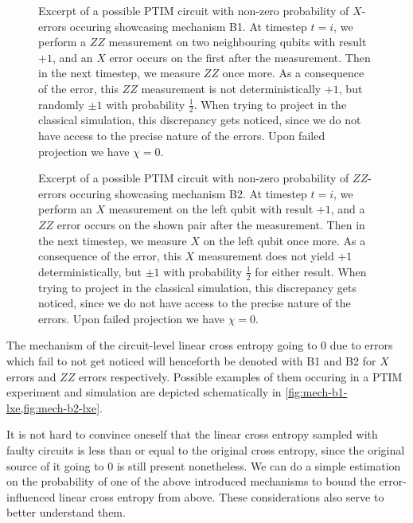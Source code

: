 \begin{figure}[t]
  \centering
  
  \caption{Excerpt of a possible PTIM circuit with non-zero probability of
  $X$-errors occuring showcasing mechanism \textsf{B1}. At timestep $t=i$, 
  we perform a $ZZ$ measurement on two neighbouring qubits with result $+1$,
  and an $X$ error occurs on the first after the measurement. Then in the next
  timestep, we measure $ZZ$ once more. As a consequence of the error, this $ZZ$
  measurement is not deterministically $+1$, but randomly $\pm 1$ with
  probability $\frac{1}{2}$. When trying to project in the classical
  simulation, this discrepancy gets noticed, since we do not have access to the
  precise nature of the errors. Upon failed projection we have $\chi=0$.}
  \label{fig:mech-b1-lxe}
\end{figure}

\begin{figure}[t]
  \centering
  
  \caption{Excerpt of a possible PTIM circuit with non-zero probability of
    $ZZ$-errors occuring showcasing mechanism \textsf{B2}. At timestep $t=i$,
    we perform an $X$ measurement on the left qubit with result $+1$, and a
    $ZZ$ error occurs on the shown pair after the measurement. Then in the next
    timestep, we measure $X$ on the left qubit once more. As a consequence of
    the error, this $X$ measurement does not yield $+1$ deterministically, but
    $\pm 1$ with probability $\frac{1}{2}$ for either result. When trying to
    project in the classical simulation, this discrepancy gets noticed, since we
    do not have access to the precise nature of the errors. Upon failed projection
    we have $\chi=0$.}
  \label{fig:mech-b2-lxe}
\end{figure}

The mechanism of the circuit-level linear cross entropy going to $0$ due to
errors which fail to not get noticed will henceforth be denoted with
\textsf{B1} and \textsf{B2} for $X$ errors and $ZZ$ errors respectively.
Possible examples of them occuring in a PTIM experiment and simulation
are depicted schematically in \cref{fig:mech-b1-lxe,fig:mech-b2-lxe}.

It is not hard to convince oneself that the linear cross entropy sampled with
faulty circuits is less than or equal to the original cross entropy, since the
original source of it going to $0$ is still present nonetheless. We can do a
simple estimation on the probability of one of the above introduced mechanisms
to bound the error-influenced linear cross entropy from above. These
considerations also serve to better understand them.


